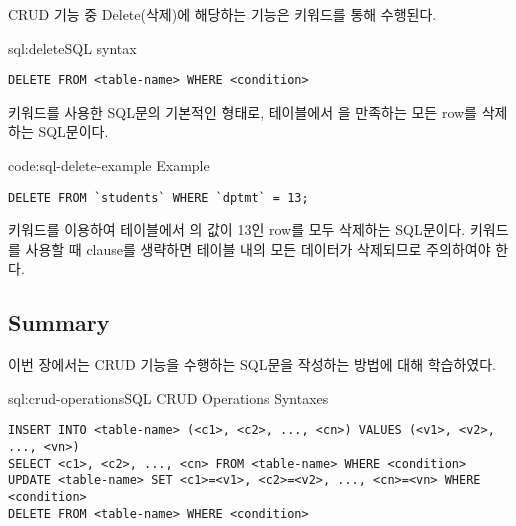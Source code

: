 CRUD 기능 중 Delete(삭제)에 해당하는 기능은  키워드를 통해 수행된다.

\begin{sql}{sql:delete}{SQL  syntax}
\begin{verbatim}
DELETE FROM <table-name> WHERE <condition>
\end{verbatim}
\end{sql}

\는  키워드를 사용한 SQL문의 기본적인 형태로,  테이블에서 을 만족하는 모든 row를 삭제하는 SQL문이다.

\begin{code}{code:sql-delete-example}{ Example}
\begin{verbatim}
DELETE FROM `students` WHERE `dptmt` = 13;
\end{verbatim}
\end{code}

\은  키워드를 이용하여  테이블에서 의 값이 13인 row를 모두 삭제하는 SQL문이다.  키워드를 사용할 때  clause를 생략하면 테이블 내의 모든 데이터가 삭제되므로 주의하여야 한다.

\subsection*{Summary}

이번 장에서는 CRUD 기능을 수행하는 SQL문을 작성하는 방법에 대해 학습하였다.

\begin{sql}{sql:crud-operations}{SQL CRUD Operations Syntaxes}
\begin{verbatim}
INSERT INTO <table-name> (<c1>, <c2>, ..., <cn>) VALUES (<v1>, <v2>, ..., <vn>)
SELECT <c1>, <c2>, ..., <cn> FROM <table-name> WHERE <condition>
UPDATE <table-name> SET <c1>=<v1>, <c2>=<v2>, ..., <cn>=<vn> WHERE <condition>
DELETE FROM <table-name> WHERE <condition>
\end{verbatim}
\end{sql}
